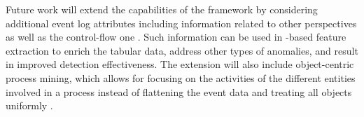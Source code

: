 Future work will extend the capabilities of the framework by considering additional event log attributes including information related to other perspectives as well as the control-flow one \cite{aalst2022pmhandbook}. Such information can be used in -based feature extraction to enrich the tabular data, address other types of anomalies, and result in improved detection effectiveness. The extension will also include object-centric process mining, which allows for focusing on the activities of the different entities involved in a process instead of flattening the event data and treating all objects uniformly \cite{aalst2023ocpm}.



